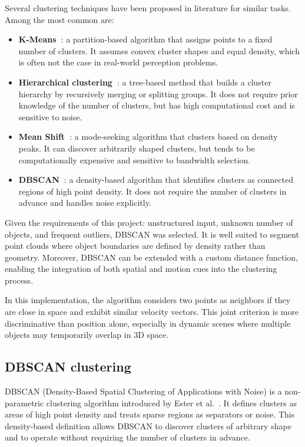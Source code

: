 Several clustering techniques have been proposed in literature for similar tasks.
Among the most common are:


\begin{itemize}
  \item \textbf{K-Means~\cite{k_means_original}}: a partition-based algorithm that assigns points to a fixed
        number of clusters. It assumes convex cluster shapes and equal density,
        which is often not the case in real-world perception problems.
  \item \textbf{Hierarchical clustering~\cite{Hierarchical_original}}: a tree-based method that builds a
        cluster hierarchy by recursively merging or splitting groups. It does not
        require prior knowledge of the number of clusters, but has high computational
        cost and is sensitive to noise.
  \item \textbf{Mean Shift~\cite{mean_shift_original}}: a mode-seeking algorithm that clusters based on density
        peaks. It can discover arbitrarily shaped clusters, but tends to be
        computationally expensive and sensitive to bandwidth selection.
  \item \textbf{\gls{DBSCAN}~\cite{dbscan_original}}: a density-based algorithm that identifies clusters as
        connected regions of high point density. It does not require the number of
        clusters in advance and handles noise explicitly.
\end{itemize}

Given the requirements of this project: unstructured input, unknown number of
objects, and frequent outliers, DBSCAN was selected. It is well suited to segment
point clouds where object boundaries are defined by density rather than geometry.
Moreover, \gls{DBSCAN} can be extended with a custom distance function, enabling the
integration of both spatial and motion cues into the clustering process.

In this implementation, the algorithm considers two points as neighbors if they
are close in space and exhibit similar velocity vectors. This joint criterion is
more discriminative than position alone, especially in dynamic scenes where
multiple objects may temporarily overlap in 3D space.


\subsection{DBSCAN clustering}
\label{sec:DBSCANClustering}

\gls{DBSCAN} (Density-Based Spatial Clustering of Applications with Noise) is a
non-parametric clustering algorithm introduced by Ester et al.~\cite{dbscan_original}.
It defines clusters as areas of high point density and treats sparse regions as
separators or noise. This density-based definition allows \gls{DBSCAN} to discover clusters
of arbitrary shape and to operate without requiring the number of clusters in advance.

